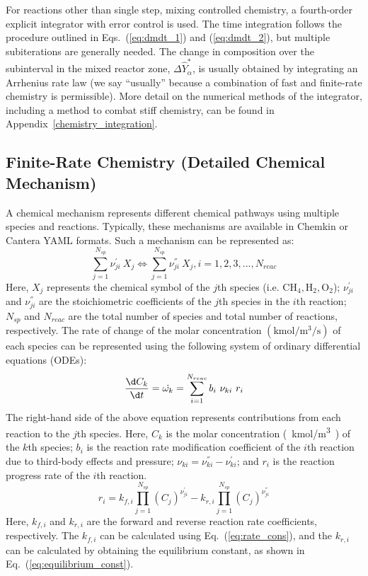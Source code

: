 For reactions other than single step, mixing controlled chemistry, a fourth-order explicit integrator with error control is used. The time integration follows the procedure outlined in Eqs.~(\ref{eq:dmdt_1}) and (\ref{eq:dmdt_2}), but multiple subiterations are generally needed. The change in composition over the subinterval in the mixed reactor zone, $\Delta \hat{Y}_\alpha^*$, is usually obtained by integrating an Arrhenius rate law (we say ``usually'' because a combination of fast and finite-rate chemistry is permissible). More detail on the numerical methods of the integrator, including a method to combat stiff chemistry, can be found in Appendix~\ref{chemistry_integration}.


\subsection{Finite-Rate Chemistry (Detailed Chemical Mechanism)}
\label{detailed_chemistry_using_mechanism}
A chemical mechanism represents different chemical pathways using multiple species and reactions. Typically, these mechanisms are available in Chemkin or Cantera YAML formats. Such a mechanism can be represented as:
\begin{equation}\label{eq:chemistry_mechanism}
\sum_{j=1}^{N_{sp}}{\nu}_{ji}^{'} \ X_j \Leftrightarrow \sum_{j=1}^{N_{sp}}{\nu}_{ji}^{''} \ X_j, i=1,2,3,...,N_{reac}
\end{equation}
Here, $X_j$ represents the chemical symbol of the $j$th species (i.e. $\mathrm{CH_4, H_2, O_2}$); ${\nu}_{ji}^{'}$ and ${\nu}_{ji}^{''}$ are the stoichiometric coefficients of the $j$th species in the $i$th reaction; ${N_{sp}}$ and ${N_{reac}}$ are the total number of species and total number of reactions, respectively.
The rate of change of the molar concentration $\mathrm{(kmol/m^3/s)}$ of each species can be represented using the following system of ordinary differential equations (ODEs):
\begin{equation}\label{eq:chemistry_ode_system}
\frac{\d C_k}{\d t} =  \dot{\omega_k} = \sum_{i=1}^{N_{reac}} b_{i} \ \nu_{ki} \ r_i
\end{equation}
The right-hand side of the above equation represents contributions from each reaction to the $j$th species. Here, $C_k$ is the molar concentration \si {(kmol/m^3)} of the $k$th species; $b_i$ is the reaction rate modification coefficient of the $i$th reaction due to third-body effects and pressure; $\nu_{ki} = {\nu}_{ki}^{''} - {\nu}_{ki}^{'}$; and $r_i$ is the reaction progress rate of the $i$th reaction.
\begin{equation}\label{eq:reaction_progress_rate}
r_i =  k_{f,i} \prod_{j=1}^{N_{sp}} (C_j)^{{\nu}_{ji}^{'}}  -  k_{r,i} \prod_{j=1}^{N_{sp}} (C_j)^{{\nu}_{ji}^{''}}
\end{equation}
Here, $k_{f,i}$ and $k_{r,i}$ are the forward and reverse reaction rate coefficients, respectively. The $k_{f,i}$ can be calculated using Eq.~(\ref{eq:rate_cons}), and the $k_{r,i}$ can be calculated by obtaining the equilibrium constant, as shown in Eq.~(\ref{eq:equilibrium_const}).

